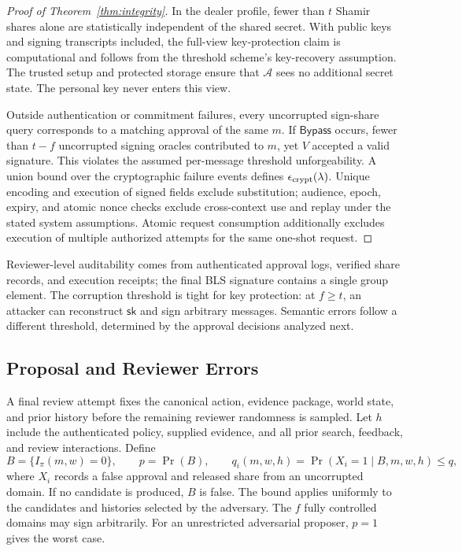 \documentclass{article}
\newcommand{\sk}{\mathsf{sk}}
\begin{document}
\begin{proof}[Proof of Theorem~\ref{thm:integrity}]
In the dealer profile, fewer than $t$ Shamir shares alone are statistically
independent of the shared secret. With public keys and signing transcripts
included, the full-view key-protection claim is computational and follows
from the threshold scheme's key-recovery assumption.
The trusted setup and protected storage ensure that $\mathcal A$ sees no
additional secret state. The personal key never enters this view.

Outside authentication or commitment failures, every uncorrupted sign-share
query corresponds to a matching approval of the same $m$.
If $\mathsf{Bypass}$ occurs, fewer than $t-f$ uncorrupted signing oracles
contributed to $m$, yet $V$ accepted a valid signature. This violates the
assumed per-message threshold unforgeability.
A union bound over the cryptographic failure events defines
$\epsilon_{\rm crypt}(\lambda)$. Unique encoding and execution of signed fields
exclude substitution; audience, epoch, expiry, and atomic nonce checks exclude
cross-context use and replay under the stated system assumptions. Atomic
request consumption additionally excludes execution of multiple authorized
attempts for the same one-shot request.
\end{proof}

Reviewer-level auditability comes from authenticated approval logs, verified
share records, and execution receipts; the final BLS signature contains a
single group element. The corruption threshold is tight for key protection:
at $f\ge t$, an attacker can reconstruct $\sk$ and sign arbitrary messages.
Semantic errors follow a different threshold, determined by the approval
decisions analyzed next.

\subsection{Proposal and Reviewer Errors}

A final review attempt fixes the canonical action, evidence package, world
state, and prior history before the remaining reviewer randomness is sampled.
Let $h$ include the authenticated policy, supplied evidence, and all prior
search, feedback, and review interactions. Define
\[
 B=\{I_\pi(m,w)=0\},\qquad
 p=\Pr(B),\qquad
 q_i(m,w,h)=\Pr(X_i=1\mid B,m,w,h)\le q,
\]
where $X_i$ records a false approval and released share from an uncorrupted
domain. If no candidate is produced, $B$ is false.
The bound applies uniformly to the candidates and histories selected by the
adversary. The $f$ fully controlled domains may sign arbitrarily. For an
unrestricted adversarial proposer, $p=1$ gives the worst case.
\end{document}
